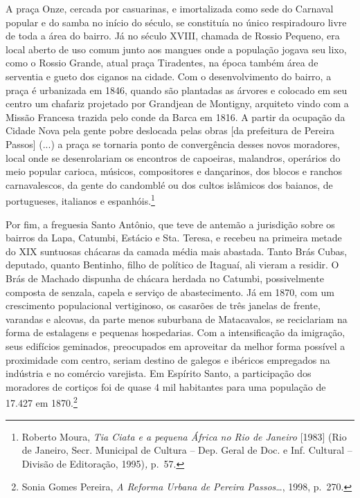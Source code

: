 A praça Onze, cercada por casuarinas, e imortalizada como sede do
Carnaval popular e do samba no início do século, se constituía no único
respiradouro livre de toda a área do bairro. Já no século XVIII, chamada
de Rossio Pequeno, era local aberto de uso comum junto aos mangues onde
a população jogava seu lixo, como o Rossio Grande, atual praça
Tiradentes, na época também área de serventia e gueto dos ciganos na
cidade. Com o desenvolvimento do bairro, a praça é urbanizada em 1846,
quando são plantadas as árvores e colocado em seu centro um chafariz
projetado por Grandjean de Montigny, arquiteto vindo com a Missão
Francesa trazida pelo conde da Barca em 1816. A partir da ocupação da
Cidade Nova pela gente pobre deslocada pelas obras {[}da prefeitura de
Pereira Passos{]} (...) a praça se tornaria ponto de convergência desses
novos moradores, local onde se desenrolariam os encontros de capoeiras,
malandros, operários do meio popular carioca, músicos, compositores e
dançarinos, dos blocos e ranchos carnavalescos, da gente do candomblé ou
dos cultos islâmicos dos baianos, de portugueses, italianos e
espanhóis.\footnote{Roberto Moura, \emph{Tia Ciata e a pequena África no
  Rio de Janeiro} {[}1983{]} (Rio de Janeiro, Secr. Municipal de Cultura
  -- Dep. Geral de Doc. e Inf. Cultural -- Divisão de Editoração,
  1995)\emph{,} p.~57.}

Por fim, a freguesia Santo Antônio, que teve de antemão a jurisdição
sobre os bairros da Lapa, Catumbi, Estácio e Sta. Teresa, e recebeu na
primeira metade do XIX suntuosas chácaras da camada média mais abastada.
Tanto Brás Cubas, deputado, quanto Bentinho, filho de político de
Itaguaí, ali vieram a residir. O Brás de Machado dispunha de chácara
herdada no Catumbi, possivelmente composta de senzala, capela e serviço
de abastecimento. Já em 1870, com um crescimento populacional
vertiginoso, os casarões de três janelas de frente, varandas e alcovas,
da parte menos suburbana de Matacavalos, se reciclariam na forma de
estalagens e pequenas hospedarias. Com a intensificação da imigração,
seus edifícios geminados, preocupados em aproveitar da melhor forma
possível a proximidade com centro, seriam destino de galegos e ibéricos
empregados na indústria e no comércio varejista. Em Espírito Santo, a
participação dos moradores de cortiços foi de quase 4 mil habitantes
para uma população de 17.427 em 1870.\footnote{Sonia Gomes Pereira,
  \emph{A Reforma Urbana de Pereira Passos}\ldots{}, 1998, p.~270.}

